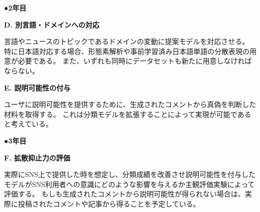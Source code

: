 {	\noindent
	●\textbf{2年目}

	\noindent
	\textbf{D. 別言語・ドメインへの対応}

	言語やニュースのトピックであるドメインの変動に提案モデルを対応させる。
	特に日本語対応する場合、形態素解析や事前学習済み日本語単語の分散表現の用意が必要である。
	また、いずれも同時にデータセットも新たに用意しなければならない。

	\noindent
	\textbf{E. 説明可能性の付与}

	ユーザに説明可能性を提供するために、生成されたコメントから真偽を判断した材料を取得する。
	これは分類モデルを拡張することによって実現が可能であると考えている。

	\noindent
	●\textbf{3年目}

	\noindent
	\textbf{F. 拡散抑止力の評価}

	実際にSNS上で提供した時を想定し、分類成績を改善させ説明可能性を付与したモデルがSNS利用者への意識にどのような影響を与えるか主観評価実験によって評価する。
	もしも生成されたコメントから説明可能性が得られない場合は、実際に投稿されたコメントや記事から得ることを予定している。


}


